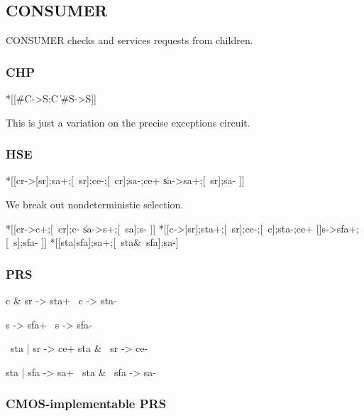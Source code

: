 \documentclass[aer.tex]{subfiles}
\begin{document}
\subsection{CONSUMER}

CONSUMER checks and services requests from children. 

\subsubsection*{CHP}

\begin{csp}
*[[#C->S;C
  \|#S->S]]
\end{csp}

\noindent
This is just a variation on the precise exceptions circuit.

\subsubsection*{HSE}

\begin{hse}
*[[cr->[sr];sa+;[~sr];ce-;[~cr];sa-;ce+
  \|sa->sa+;[~sr];sa-
 ]]
\end{hse}

\noindent
We break out nondeterministic selection.

\begin{hse}
*[[cr->c+;[~cr];c-
  \|sa->s+;[~sa];s-
 ]]
*[[c->[sr];sta+;[~sr];ce-;[~c];sta-;ce+
  []s->sfa+;[~s];sfa-
 ]]
*[[sta|sfa];sa+;[~sta&~sfa];sa-]
\end{hse}

\subsubsection*{PRS}

\begin{prs2}
c & sr -> sta+
~c -> sta-

s -> sfa+
~s -> sfa-
\end{prs2}

\begin{prs2}
~sta | sr -> ce+
sta & ~sr -> ce-
\end{prs2}

\begin{prs2}
sta | sfa -> sa+
~sta & ~sfa -> sa-
\end{prs2}

\subsubsection*{CMOS-implementable PRS}
\end{document}
